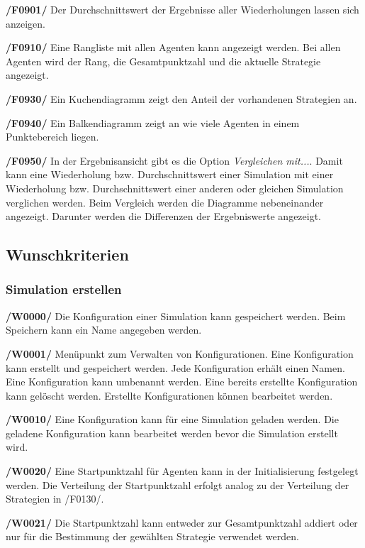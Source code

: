 \textbf{/F0901/}
Der Durchschnittswert der Ergebnisse aller Wiederholungen lassen sich anzeigen.

\textbf{/F0910/}
Eine Rangliste mit allen Agenten kann angezeigt werden. Bei allen Agenten wird der Rang, die Gesamtpunktzahl und die aktuelle Strategie angezeigt.

\textbf{/F0930/}
Ein Kuchendiagramm zeigt den Anteil der vorhandenen Strategien an.

\textbf{/F0940/}
Ein Balkendiagramm zeigt an wie viele Agenten in einem Punktebereich liegen. 

\textbf{/F0950/}
In der Ergebnisansicht gibt es die Option \emph{Vergleichen mit...}. Damit kann eine Wiederholung bzw. Durchschnittswert einer Simulation mit einer Wiederholung bzw. Durchschnittswert einer anderen oder gleichen Simulation verglichen werden. Beim Vergleich werden die Diagramme nebeneinander angezeigt. Darunter werden die Differenzen der Ergebniswerte angezeigt.

\subsection{Wunschkriterien}

\subsubsection{Simulation erstellen}

\textbf{/W0000/}
Die Konfiguration einer Simulation kann gespeichert werden. Beim Speichern kann ein Name angegeben werden.

\textbf{/W0001/}
Menüpunkt zum Verwalten von Konfigurationen. Eine Konfiguration kann erstellt und gespeichert werden. Jede Konfiguration erhält einen Namen. Eine Konfiguration kann umbenannt werden. Eine bereits erstellte Konfiguration kann gelöscht werden. Erstellte Konfigurationen können bearbeitet werden.

\textbf{/W0010/}
Eine Konfiguration kann für eine Simulation geladen werden. Die geladene Konfiguration kann bearbeitet werden bevor die Simulation erstellt wird.

\textbf{/W0020/}
Eine Startpunktzahl für Agenten kann in der Initialisierung festgelegt werden. Die Verteilung der Startpunktzahl erfolgt analog zu der Verteilung der Strategien in /F0130/.

\textbf{/W0021/}
Die Startpunktzahl kann entweder zur Gesamtpunktzahl addiert oder nur für die Bestimmung der gewählten Strategie verwendet werden. 


